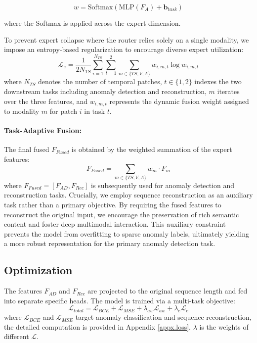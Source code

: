 \documentclass{article}
\theoremstyle{plain}
\theoremstyle{definition}
\theoremstyle{remark}
\begin{document}
\begin{equation}
w = \text{Softmax}(\text{MLP}(F_A) + \mathbf{b}_{task})
\end{equation}

where the Softmax is applied across the expert dimension. 

To prevent expert collapse where the router relies solely on a single modality, we impose an entropy-based regularization to encourage diverse expert utilization:
\begin{equation}
\mathcal{L}_e = \frac{1}{2N_{TS}} \sum_{i=1}^{N_{TS}} \sum_{t=1}^{2} \sum_{m \in \{TS, V, A\}} w_{i,m,t} \log w_{i,m,t}
\end{equation}
where $N_{TS}$ denotes the number of temporal patches, $t \in \{1, 2\}$ indexes the two downstream tasks including anomaly detection and reconstruction, $m$ iterates over the three features, and $w_{i,m,t}$ represents the dynamic fusion weight assigned to modality $m$ for patch $i$ in task $t$.

\paragraph{Task-Adaptive Fusion:}
The final fused $F_{Fused}$ is obtained by the weighted summation of the expert features:
\begin{equation}
F_{Fused} = \sum_{m \in \{TS, V, A\}} w_{m} \cdot F_{m} 
\end{equation}
where $F_{Fused}=[F_{AD},F_{Rec}]$ is subsequently used for anomaly detection and reconstruction tasks. Crucially, we employ sequence reconstruction as an auxiliary task rather than a primary objective. By requiring the fused features to reconstruct the original input, we encourage the preservation of rich semantic content and foster deep multimodal interaction. This auxiliary constraint prevents the model from overfitting to sparse anomaly labels, ultimately yielding a more robust representation for the primary anomaly detection task.


\subsection{Optimization}
The features $F_{AD}$ and $F_{Rec}$ are projected to the original sequence length and fed into separate specific heads. The model is trained via a multi-task objective:
\begin{equation}
\mathcal{L}_{total} = \mathcal{L}_{BCE} + \mathcal{L}_{MSE} + \lambda_{aw} \mathcal{L}_{aw} + \lambda_{e} \mathcal{L}_{e}
\end{equation}
where $\mathcal{L}_{BCE}$ and $\mathcal{L}_{MSE}$ target anomaly classification and sequence reconstruction, the detailed computation is provided in Appendix \ref{appx.loss}. $\lambda$ is the weights of different $\mathcal{L}$.
\end{document}
